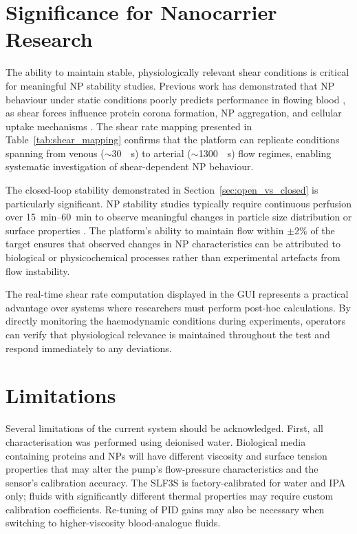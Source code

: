 \section{Significance for Nanocarrier Research}

The ability to maintain stable, physiologically relevant shear conditions is critical for meaningful NP stability studies. Previous work has demonstrated that NP behaviour under static conditions poorly predicts performance in flowing blood \citep{Cooley2018, Thomas2014}, as shear forces influence protein corona formation, NP aggregation, and cellular uptake mechanisms \citep{Blanco2015}. The shear rate mapping presented in Table~\ref{tab:shear_mapping} confirms that the platform can replicate conditions spanning from venous ($\sim$\SI{30}{\per\second}) to arterial ($\sim$\SI{1300}{\per\second}) flow regimes, enabling systematic investigation of shear-dependent NP behaviour.

The closed-loop stability demonstrated in Section~\ref{sec:open_vs_closed} is particularly significant. NP stability studies typically require continuous perfusion over \SIrange{15}{60}{\minute} to observe meaningful changes in particle size distribution or surface properties \citep{Mitchell2021}. The platform's ability to maintain flow within $\pm$2\% of the target ensures that observed changes in NP characteristics can be attributed to biological or physicochemical processes rather than experimental artefacts from flow instability.

The real-time shear rate computation displayed in the GUI represents a practical advantage over systems where researchers must perform post-hoc calculations. By directly monitoring the haemodynamic conditions during experiments, operators can verify that physiological relevance is maintained throughout the test and respond immediately to any deviations.

\section{Limitations}

Several limitations of the current system should be acknowledged. First, all characterisation was performed using deionised water. Biological media containing proteins and NPs will have different viscosity and surface tension properties that may alter the pump's flow-pressure characteristics and the sensor's calibration accuracy. The SLF3S is factory-calibrated for water and IPA only; fluids with significantly different thermal properties may require custom calibration coefficients. Re-tuning of PID gains may also be necessary when switching to higher-viscosity blood-analogue fluids.

